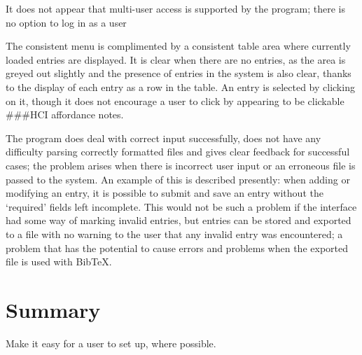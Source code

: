 \documentclass{l4proj}
\newcommand{\BibTeX}{B{\sc ib}\TeX}
\newcommand{\bibtex}{\BibTeX}
\newcommand{\revisit}{\#\#\#}
\begin{document}
It does not appear that multi-user access is supported by the program; there is no option to log in as a user

The consistent menu is complimented by a consistent table area where currently loaded entries are displayed.  It is clear when there are no entries, as the area is greyed out slightly and the presence of entries in the system is also clear, thanks to the display of each entry as a row in the table.  An entry is selected by clicking on it, though it does not encourage a user to click by appearing to be clickable  \revisit HCI affordance notes.

The program does deal with correct input successfully, does not have any difficulty parsing correctly formatted files and gives clear feedback for successful cases; the problem arises when there is incorrect user input or an erroneous file is passed to the system.  An example of this is described presently: when adding or modifying an entry, it is possible to submit and save an entry without the `required' fields left incomplete.  This would not be such a problem if the interface had some way of marking invalid entries, but entries can be stored and exported to a file with no warning to the user that any invalid entry was encountered; a problem that has the potential to cause errors and problems when the exported file is used with \bibtex{}.









\section{Summary}
Make it easy for a user to set up, where possible.
\end{document}
